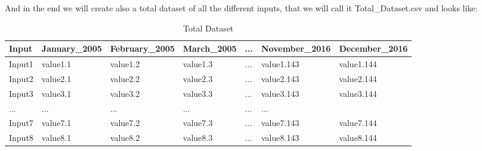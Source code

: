 And in the end we will create also a total dataset of all the different inputs, that we will call it Total\_Dataset.csv and looks like:
\begin{table}[ht] 
    \label{table:Total_Dataset} 
    \centering 
    \begin{tabular}{ | l | l | l | l | l | l | l |}
        \hline
       	Input & January\_2005 & February\_2005 & March\_2005 & ... & November\_2016 & December\_2016\\ \hline
        Input1 & value1.1 & value1.2 & value1.3 & ... & value1.143 & value1.144\\ \hline
        Input2 & value2.1 & value2.2 & value2.3 & ... & value2.143 & value2.144\\ \hline
        Input3 & value3.1 & value3.2 & value3.3 & ... & value3.143 & value3.144\\ \hline
        ... & ... & ... & ... & ... & ...\\ \hline
        Input7 & value7.1 & value7.2 & value7.3 & ... & value7.143 & value7.144\\ \hline
        Input8 & value8.1 & value8.2 & value8.3 & ... & value8.143 & value8.144\\ \hline
    \end{tabular}
    \caption[Total Dataset]{Total Dataset}
\end{table}  
\newpage







